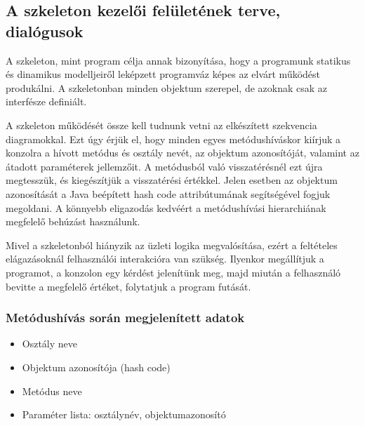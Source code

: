 \begin{enumerate}[label=\textbf{\arabic*.}, start=0]
		\end{enumerate}
	
	\subsection{A szkeleton kezelői felületének terve, dialógusok}
		A szkeleton, mint program célja annak bizonyítása, hogy a programunk statikus és dinamikus modelljeiről leképzett programváz képes az elvárt működést produkálni. A szkeletonban minden objektum szerepel, de azoknak csak az interfésze definiált.
		
		A szkeleton működését össze kell tudnunk vetni az elkészített szekvencia diagramokkal. Ezt úgy érjük el, hogy minden egyes metódushíváskor kiírjuk a konzolra a hívott metódus és osztály nevét, az objektum azonosítóját, valamint az átadott paraméterek jellemzőit. A metódusból való visszatérésnél ezt újra megtesszük, és kiegészítjük a visszatérési értékkel. Jelen esetben az objektum azonosítását a Java beépített hash code attribútumának segítségével fogjuk megoldani. A könnyebb eligazodás kedvéért a metódushívási hierarchiának megfelelő behúzást használunk.
		
		Mivel a szkeletonból hiányzik az üzleti logika megvalósítása, ezért a feltételes elágazásoknál felhasználói interakcióra van szükség. Ilyenkor megállítjuk a programot, a konzolon egy kérdést jelenítünk meg, majd miután a felhasználó bevitte a megfelelő értéket, folytatjuk a program futását.
		
		\subsubsection*{Metódushívás során megjelenített adatok}
			\begin{itemize}
				\item Osztály neve
				\item Objektum azonosítója (hash code)
				\item Metódus neve
				\item Paraméter lista: osztálynév, objektumazonosító
			\end{itemize}					
		
